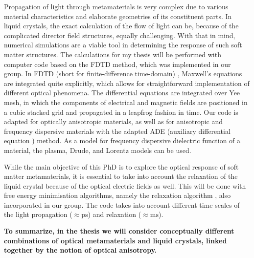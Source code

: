 \documentclass[a4paper,11pt]{article}
\begin{document}

Propagation of light through metamaterials is very complex due to various material characteristics and elaborate geometries of its constituent parts. 
In liquid crystals, the exact calculation of the flow of light can be, because of the complicated director field structures, equally challenging.
With that in mind, numerical simulations are a viable tool in determining the response of such soft matter structures. 
The calculations for my thesis will be performed with computer code based on the FDTD method, which was implemented in our group.
In FDTD (short for finite-difference time-domain) \cite{taflove1}, Maxwell's equations are integrated quite explicitly, which allows for straightforward implementation of different optical phenomena.
The differential equations are integrated over Yee mesh, in which the components of electrical and magnetic fields are positioned in a cubic stacked grid and propagated in a leapfrog fashion in time. 
Our code is adapted for optically anisotropic materials, as well as for anisotropic and frequency dispersive materials with the adapted ADE (auxiliary differential equation \cite{taflove1}) method. 
As a model for frequency dispersive dielectric function of a material, the plasma, Drude, and Lorentz models can be used. 

While the main objective of this PhD is to explore the optical response of soft matter metamaterials, it is essential to take into account the relaxation of the liquid crystal because of the optical electric fields as well. 
This will be done with free energy minimisation algorithms, namely the relaxation algorithm \cite{ravnik-2009-lc-modelling}, also incorporated in our group. 
The code takes into account different time scales of the light propagation ($\approx \mathrm{ps}$) and relaxation ($\approx \mathrm{ms}$). 

{ \bfseries To summarize, in the thesis we will consider conceptually different combinations of optical metamaterials and liquid crystals, linked together by the notion of optical anisotropy. 
}


\end{document}
